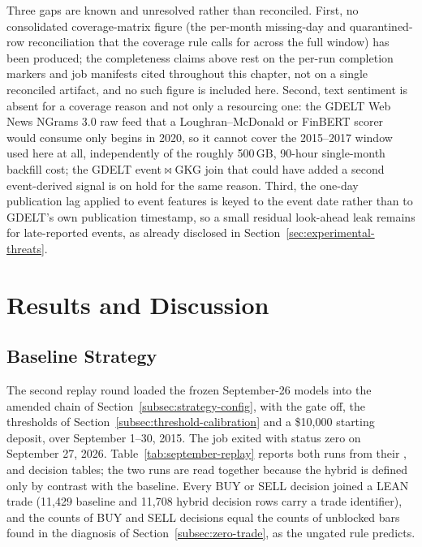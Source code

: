 Three gaps are known and unresolved rather than reconciled. First, no consolidated coverage-matrix figure (the per-month missing-day and quarantined-row reconciliation that the coverage rule calls for across the full window) has been produced; the completeness claims above rest on the per-run completion markers and job manifests cited throughout this chapter, not on a single reconciled artifact, and no such figure is included here. Second, text sentiment is absent for a coverage reason and not only a resourcing one: the GDELT Web News NGrams 3.0 raw feed that a Loughran--McDonald or FinBERT scorer would consume only begins in 2020, so it cannot cover the 2015--2017 window used here at all, independently of the roughly 500\,GB, 90-hour single-month backfill cost; the GDELT event$\bowtie$GKG join that could have added a second event-derived signal is on hold for the same reason. Third, the one-day publication lag applied to event features is keyed to the event date rather than to GDELT's own publication timestamp, so a small residual look-ahead leak remains for late-reported events, as already disclosed in Section~\ref{sec:experimental-threats}.

\section{Results and Discussion} \label{sec:results-discussion}

\subsection{Baseline Strategy} \label{sec:baseline-results}

The second replay round loaded the frozen September-26 models into the amended chain of Section~\ref{subsec:strategy-config}, with the gate off, the thresholds of Section~\ref{subsec:threshold-calibration} and a \$10,000 starting deposit, over September 1--30, 2015. The job exited with status zero on September 27, 2026. Table~\ref{tab:september-replay} reports both runs from their ,  and decision tables; the two runs are read together because the hybrid is defined only by contrast with the baseline. Every BUY or SELL decision joined a LEAN trade (11,429 baseline and 11,708 hybrid decision rows carry a trade identifier), and the counts of BUY and SELL decisions equal the counts of unblocked bars found in the diagnosis of Section~\ref{subsec:zero-trade}, as the ungated rule predicts.


